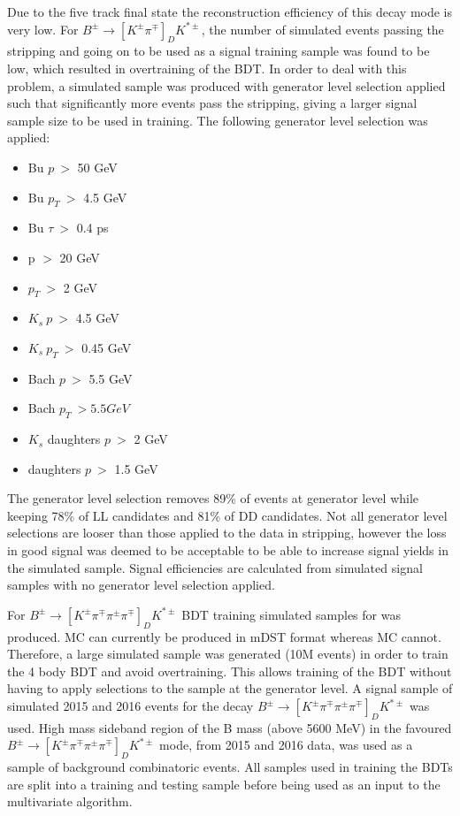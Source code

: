 Due to the five track final state the reconstruction efficiency of this decay mode is very low. For $B^{\pm} \to [K^{\pm}\pi^{\mp}]_D K^{*\pm}$, the number of simulated events passing the stripping and going on to be used as a signal training sample was found to be low, which resulted in overtraining of the BDT. In order to deal with this problem, a simulated sample was produced with generator level selection applied such that significantly more events pass the stripping, giving a larger signal sample size to be used in training. The following generator level selection was applied:

\begin{itemize}
\item{Bu $p\ >$ 50 GeV}
\item{Bu $p_T\ >$ 4.5 GeV}
\item{Bu $\tau\ >$ 0.4 ps}
\item{\Dz p $>$ 20 GeV}
\item{\Dz $p_T\ >$ 2 GeV}
\item{$K_s\ p\ >$ 4.5 GeV}
\item{$K_s\ p_T\ >$ 0.45 GeV}
\item{Bach $p\ >$ 5.5 GeV}
\item{Bach $p_T\ > 5.5 GeV$}
\item{$K_s$ daughters $p\ >$ 2 GeV}
\item{\Dz daughters $p\ >$ 1.5 GeV}
\end{itemize}

The generator level selection removes 89\% of events at generator level while keeping 78\% of LL candidates and 81\% of DD candidates. Not all generator level selections are looser than those applied to the data in stripping, however the loss in good signal was deemed to be acceptable to be able to increase signal yields in the simulated sample. Signal efficiencies are calculated from simulated signal samples with no generator level selection applied.

For $B^{\pm} \to [K^{\pm}\pi^{\mp}\pi^{\pm}\pi^{\mp}]_D K^{*\pm}$ BDT training simulated samples for \runtwo was produced. \runtwo MC can currently be produced in mDST format whereas \runone MC cannot. Therefore, a large \runtwo simulated sample was generated (10M events) in order to train the 4 body BDT and avoid overtraining. This allows training of the BDT without having to apply selections to the sample at the generator level. A signal sample of simulated 2015 and 2016 events for the decay $B^{\pm} \to [K^{\pm}\pi^{\mp}\pi^{\pm}\pi^{\mp}]_D K^{*\pm}$ was used. High mass sideband region of the B mass (above 5600 MeV) in the favoured $B^{\pm} \to [K^{\pm}\pi^{\mp}\pi^{\pm}\pi^{\mp}]_D K^{*\pm}$ mode, from 2015 and 2016 data, was used as a sample of background combinatoric events. All samples used in training the BDTs are split into a training and testing sample before being used as an input to the multivariate algorithm.


